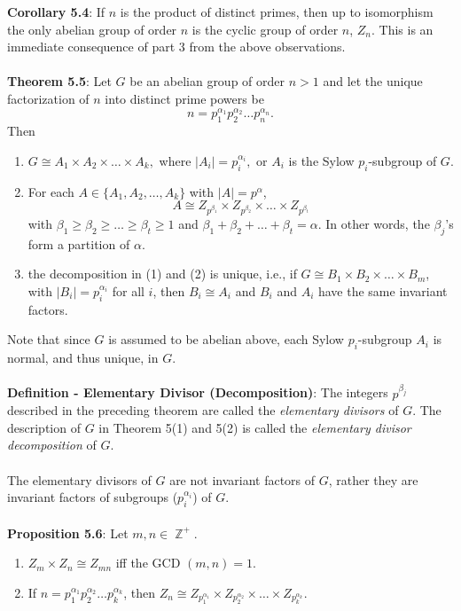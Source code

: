 \documentclass{article}
\DeclareMathOperator{\Z}{\mathbb{Z}}
\begin{document}
\textbf{Corollary 5.4}: If $n$ is the product of distinct primes, then up to isomorphism the only abelian group of order $n$ is the cyclic group of order $n$, $Z_n$. This is an immediate consequence of part 3 from the above observations. \\ \\
\textbf{Theorem 5.5}: Let $G$ be an abelian group of order $n > 1$ and let the unique factorization of $n$ into distinct prime powers be $$n = p_1^{\alpha_1} p_2^{\alpha_2} \dots p_n^{\alpha_n}.$$ Then \begin{enumerate}
    \item $G \cong A_1 \times A_2 \times \dots \times A_k,$ where $|A_i| = p_i^{\alpha_i},$ or $A_i$ is the Sylow $p_i$-subgroup of $G$.
    \item For each $A \in \{A_1, A_2, \dots, A_k\}$ with $|A| = p^\alpha$, $$A \cong Z_{p^{\beta_1}} \times  Z_{p^{\beta_2}} \times \dots \times Z_{p^{\beta_t}}$$ with $\beta_1 \geq \beta_2 \geq \dots \geq \beta_t \geq 1$ and $\beta_1 + \beta_2 + \dots + \beta_t = \alpha$. In other words, the $\beta_j$'s form a partition of $\alpha$.
    \item the decomposition in (1) and (2) is unique, i.e., if $G \cong B_1 \times B_2 \times \dots \times B_m$, with $|B_i| = p_i^{\alpha_i}$ for all $i$, then $B_i \cong A_i$ and $B_i$ and $A_i$ have the same invariant factors. 
\end{enumerate} $ $ \\
Note that since $G$ is assumed to be abelian above, each Sylow $p_i$-subgroup $A_i$ is normal, and thus unique, in $G$. \\ \\
\textbf{Definition - Elementary Divisor (Decomposition)}: The integers $p^{\beta_j}$ described in the preceding theorem are called the \textit{elementary divisors} of $G$. The description of $G$ in Theorem 5(1) and 5(2) is called the \textit{elementary divisor decomposition} of $G$. \\ \\
The elementary divisors of $G$ are not invariant factors of $G$, rather they are invariant factors of subgroups ($p_i^{\alpha_i}$) of $G$. \\ \\
\textbf{Proposition 5.6}: Let $m, n \in \Z^+$. \begin{enumerate}
    \item $Z_m \times Z_n \cong Z_{mn}$ iff the GCD $(m, n) = 1$.
    \item If $n = p_1^{\alpha_1} p_2^{\alpha_2} \dots p_k^{\alpha_k}$, then $Z_n \cong Z_{p_1^{\alpha_1}} \times Z_{p_2^{\alpha_2}} \times \dots \times Z_{p_k^{\alpha_k}}.$
\end{enumerate} $ $ \\
\end{document}
